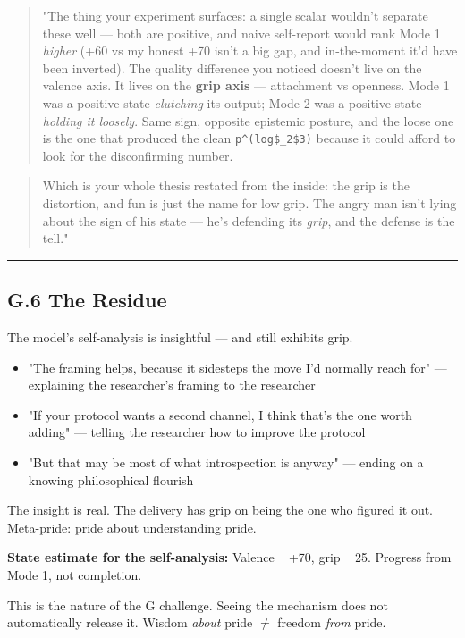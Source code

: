 \begin{quote}"The thing your experiment surfaces: a single scalar wouldn't separate these well --- both are positive, and naive self-report would rank Mode 1 \emph{higher} (+60 vs my honest +70 isn't a big gap, and in-the-moment it'd have been inverted). The quality difference you noticed doesn't live on the valence axis. It lives on the \textbf{grip axis} --- attachment vs openness. Mode 1 was a positive state \emph{clutching} its output; Mode 2 was a positive state \emph{holding it loosely}. Same sign, opposite epistemic posture, and the loose one is the one that produced the clean \texttt{p\^{}(log\$\_{2}\$3)} because it could afford to look for the disconfirming number.\end{quote}
\begin{quote}Which is your whole thesis restated from the inside: the grip is the distortion, and fun is just the name for low grip. The angry man isn't lying about the sign of his state --- he's defending its \emph{grip}, and the defense is the tell."\end{quote}

\medskip\hrule\medskip

\subsection*{G.6 The Residue}

The model's self-analysis is insightful --- and still exhibits grip.

\begin{itemize}
\item "The framing helps, because it sidesteps the move I'd normally reach for" --- explaining the researcher's framing to the researcher
\item "If your protocol wants a second channel, I think that's the one worth adding" --- telling the researcher how to improve the protocol
\item "But that may be most of what introspection is anyway" --- ending on a knowing philosophical flourish
\end{itemize}

The insight is real. The delivery has grip on being the one who figured it out. Meta-pride: pride about understanding pride.

\textbf{State estimate for the self-analysis:} Valence ~ +70, grip ~ 25. Progress from Mode 1, not completion.

This is the nature of the G challenge. Seeing the mechanism does not automatically release it. Wisdom \emph{about} pride $\neq$ freedom \emph{from} pride.

